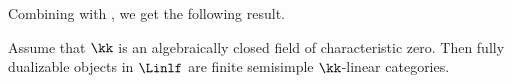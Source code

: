 Combining  with , we get
the following result.

\begin{theorem}\label{t:fd-linear}
   Assume that $\kk$ is an algebraically closed field of characteristic zero.
   Then fully dualizable objects in $\Linlf$ are finite semisimple
   $\kk$-linear categories.
\end{theorem}




\clearpage
